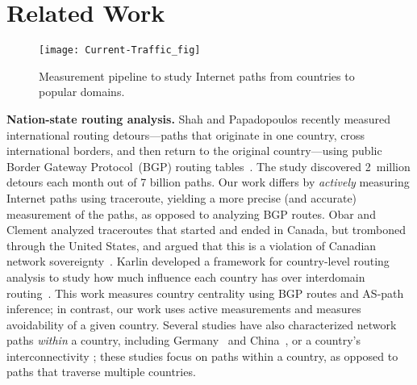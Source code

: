 \section{Related Work}
\label{related}

\begin{figure*}[t]
\centering
\texttt{[image: Current-Traffic\_fig]}
\caption{Measurement pipeline to study Internet paths from countries to
  popular domains.}
\label{fig:pipeline1}
\end{figure*}

{\bf Nation-state routing analysis.}  Shah and
Papadopoulos recently measured international routing detours---paths that originate
in
one country, cross international borders, and then return to the
original country---using public Border Gateway Protocol~(BGP) routing tables~\cite
{shah2015characterizing}. 
The study discovered 2~million detours each month out
of 7 billion paths.
Our work differs by {\em actively}
measuring Internet paths using traceroute, yielding a more precise (and accurate) measurement of the paths, %
as opposed to analyzing BGP
routes.  Obar and Clement analyzed traceroutes
that started and ended in Canada, but tromboned through the United
States, and argued that
this is a violation of Canadian network
sovereignty~\cite{obar2012internet}. 
Karlin \ea{} developed a framework for country-level
routing analysis to study how much influence each country has over
interdomain routing~\cite{karlin2009nation}.  This work measures country
centrality using BGP routes and AS-path inference; in contrast, our work uses active 
measurements and measures avoidability of a given country. Several studies have also characterized network paths {\em
within} a country, including
Germany~\cite{wahlisch2010framework,wahlisch2012exposing} and
China~\cite{zhou2007chinese}, or a country's interconnectivity %
\cite{bischof2015and,gupta2014peering,fanou2015diversity,roberts2011mapping}; these studies
focus on paths within a country, as opposed to paths that traverse multiple countries.


